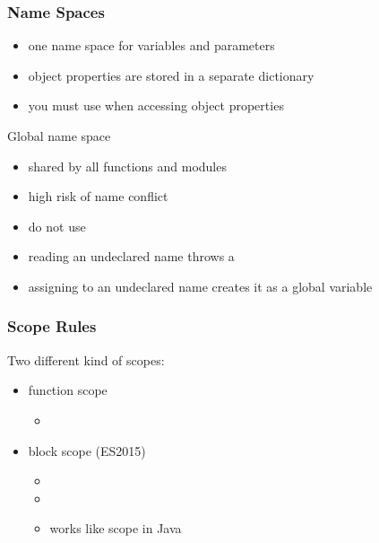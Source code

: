 \begin{frame}[fragile] \frametitle{Name Spaces}
\begin{itemize}
 \item one name space for variables and parameters
 \item object properties are stored in a separate dictionary
 \item you must use  when accessing object properties
\end{itemize}
\vspace{3mm}
Global name space
\begin{itemize}
  \item shared by all functions and modules
  \item high risk of name conflict
  \item do not use
\end{itemize}
\vspace{3mm}
\begin{itemize}
  \item reading an undeclared name throws a 
  \item assigning to an undeclared name creates it as a global variable
\end{itemize}
\end{frame}

\begin{frame}[fragile] \frametitle{Scope Rules}
Two different kind of scopes:
\begin{itemize}
  \item  function scope
  \begin{itemize}
    \item {}
  \end{itemize}
  \item block scope (ES2015)
  \begin{itemize}
    \item {}
    \item {}
    \item works like scope in Java
  \end{itemize}
\end{itemize}
\vspace{4mm}

\end{frame}

